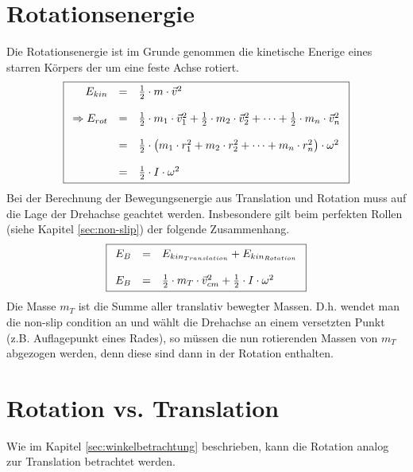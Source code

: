 \section{Rotationsenergie}
Die Rotationsenergie ist im Grunde genommen die kinetische Enerige
eines starren Körpers der um eine feste Achse rotiert.
\[ \boxed{\begin{array}{r c l}
E_{kin} 
		&=& \frac{1}{2} \cdot m \cdot \vec{v}^2 \\
	& & \\
	\Rightarrow E_{rot} 
		&=& \frac{1}{2} \cdot m_1 \cdot \vec{v}_1^2
			+ \frac{1}{2} \cdot m_2 \cdot \vec{v}_2^2
			+ \dots 
			+ \frac{1}{2} \cdot m_n \cdot \vec{v}_n^2 \\
	& & \\
		&=& \frac{1}{2} \cdot \left(m_1 \cdot r_1^2
			+ m_2 \cdot r_2^2 
			+ \dots
			+ m_n \cdot r_n^2\right) \cdot \omega^2 \\
	& &\\
		&=& \frac{1}{2} \cdot I \cdot \omega^2 
\end{array} } \]
Bei der Berechnung der Bewegungsenergie aus Translation und 
Rotation muss auf die Lage der Drehachse geachtet werden. Insbesondere 
gilt beim perfekten Rollen (siehe Kapitel \ref{sec:non-slip}) der 
folgende Zusammenhang.
\[ \boxed{\begin{array}{r c l}
	E_B 
		&=& E_{kin_{Translation}} + E_{kin_{Rotation}} \\
	& \\
	E_B 
		&=& \frac{1}{2} \cdot m_T \cdot {\vec{v}_{cm}}^2 
			+ \frac{1}{2} \cdot I \cdot \omega^2 
\end{array}}\]
Die Masse $m_T$ ist die Summe aller translativ bewegter Massen. D.h. 
wendet man die non-slip condition an und wählt die Drehachse an einem 
versetzten Punkt (z.B. Auflagepunkt eines Rades), so müssen die nun
rotierenden Massen von $m_T$ abgezogen werden, denn diese sind dann in
der Rotation enthalten.
\newpage
\section{Rotation vs. Translation}
Wie im Kapitel \ref{sec:winkelbetrachtung} beschrieben, kann die 
Rotation analog zur Translation betrachtet werden.

